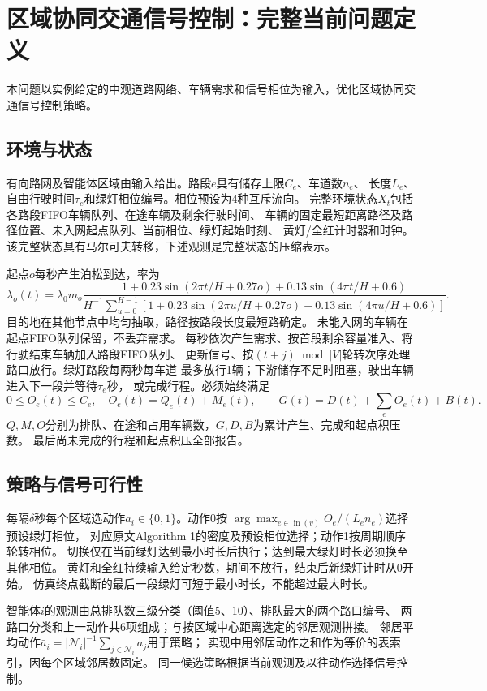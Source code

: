 \documentclass[UTF8]{ctexart}
\begin{document}
\section*{区域协同交通信号控制：完整当前问题定义}
本问题以实例给定的中观道路网络、车辆需求和信号相位为输入，优化区域协同交通信号控制策略。

\subsection*{环境与状态}
有向路网及智能体区域由输入给出。路段$e$具有储存上限$C_e$、车道数$n_e$、
长度$L_e$、自由行驶时间$\tau_e$和绿灯相位编号。相位预设为4种互斥流向。
完整环境状态$X_t$包括各路段FIFO车辆队列、在途车辆及剩余行驶时间、
车辆的固定最短距离路径及路径位置、未入网起点队列、当前相位、绿灯起始时刻、
黄灯/全红计时器和时钟。该完整状态具有马尔可夫转移，下述观测是完整状态的压缩表示。

起点$o$每秒产生泊松到达，率为
\[
\lambda_o(t)=\lambda_0m_o
\frac{1+0.23\sin(2\pi t/H+0.27o)+0.13\sin(4\pi t/H+0.6)}
{H^{-1}\sum_{u=0}^{H-1}[1+0.23\sin(2\pi u/H+0.27o)+0.13\sin(4\pi u/H+0.6)]}.
\]
目的地在其他节点中均匀抽取，路径按路段长度最短路确定。
未能入网的车辆在起点FIFO队列保留，不丢弃需求。
每秒依次产生需求、按首段剩余容量准入、将行驶结束车辆加入路段FIFO队列、
更新信号、按$(t+j)\bmod |V|$轮转次序处理路口放行。绿灯路段每两秒每车道
最多放行1辆；下游储存不足时阻塞，驶出车辆进入下一段并等待$\tau_e$秒，
或完成行程。必须始终满足
\[
0\le O_e(t)\le C_e,\quad O_e(t)=Q_e(t)+M_e(t),\qquad
G(t)=D(t)+\sum_eO_e(t)+B(t).
\]
$Q,M,O$分别为排队、在途和占用车辆数，$G,D,B$为累计产生、完成和起点积压数。
最后尚未完成的行程和起点积压全部报告。

\subsection*{策略与信号可行性}
每隔$\delta$秒每个区域选动作$a_i\in\{0,1\}$。动作0按
$\arg\max_{e\in\operatorname{in}(v)}O_e/(L_en_e)$选择预设绿灯相位，
对应原文Algorithm 1的密度及预设相位选择；动作1按周期顺序轮转相位。
切换仅在当前绿灯达到最小时长后执行；达到最大绿灯时长必须换至其他相位。
黄灯和全红持续输入给定秒数，期间不放行，结束后新绿灯计时从0开始。
仿真终点截断的最后一段绿灯可短于最小时长，不能超过最大时长。

智能体$i$的观测由总排队数三级分类（阈值5、10）、排队最大的两个路口编号、
两路口分类和上一动作共6项组成；与按区域中心距离选定的邻居观测拼接。
邻居平均动作$\bar a_i=|\mathcal N_i|^{-1}\sum_{j\in\mathcal N_i}a_j$用于策略；
实现中用邻居动作之和作为等价的表索引，因每个区域邻居数固定。
同一候选策略根据当前观测及以往动作选择信号控制。
\end{document}
